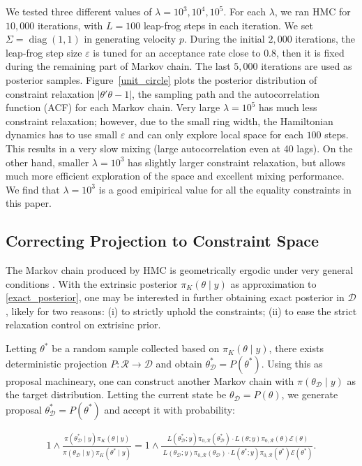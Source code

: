 \documentclass[10pt]{article}
\newcommand{\mc}[1]{\mathcal{#1}}
\DeclareMathOperator{\diag}{diag}
\begin{document}
We tested three different values of $\lambda = 10^3,10^4,10^5$. For each $\lambda$, we ran HMC for $10,000$ iterations, with $L=100$ leap-frog steps in each iteration. 
We set $\Sigma= \diag(1,1)$ in generating velocity $p$. During the initial $2,000$ iterations, the leap-frog step size $\varepsilon$ is tuned for an acceptance rate close to $0.8$, then it is fixed during the remaining part of Markov chain. The last $5,000$ iterations are used as posterior samples. Figure~\ref{unit_circle} plots the posterior distribution of constraint relaxation $|\theta'\theta -1|$, the sampling path and the autocorrelation function (ACF) for each Markov chain. Very large $\lambda=10^5$ has much less constraint relaxation; however, due to the small ring width, the Hamiltonian dynamics has to use small $\varepsilon$ and can only explore local space for each $100$ steps. This results in a very slow mixing (large autocorrelation even at 40 lags). On the other hand, smaller $\lambda=10^3$ has slightly larger constraint relaxation, but allows much more efficient exploration of the space and excellent mixing performance. We find that $\lambda=10^3$ is a good emipirical value for all the equality constraints in this paper.


\subsection{Correcting Projection to Constraint Space}
 
The Markov chain produced by HMC is geometrically ergodic under very general conditions \citep{livingstone2016geometric}. With the extrinsic posterior $\pi_K(\theta \mid y)$ as approximation to \eqref{exact_posterior}, one may be interested in further obtaining exact posterior in $\mc D$, likely for two reasons:  (i) to strictly uphold the constraints; (ii) to ease the strict relaxation control on extrisinc prior.

Letting $\theta^*$ be a random sample collected based on $\pi_K(\theta \mid y)$, there exists deterministic projection $P: \mc R\rightarrow \mc D$ and obtain $\theta^*_{\mc D}= P(\theta^*)$. Using this as proposal machineary, one can construct another Markov chain with $\pi(\theta_{\mc D}  \mid y)$ as the target distribution. Letting the current state be $\theta_{\mc D} = P(\theta)$, we generate proposal $\theta^*_{\mc D}= P(\theta^*)$ and accept it with probability:

\begin{equation}
 \begin{aligned}
 1 \wedge \frac{\pi(\theta^*_{\mc D} \mid y) \pi_K(\theta  \mid y) }{\pi(\theta_{\mc D}  \mid y)\pi_K(\theta^* \mid y)} =  1 \wedge \frac{\ L(\theta^*_{\mc D};y)\pi_{0,\mc R}(\theta^*_{\mc D})  \cdot    L(\theta;y)\pi_{0,\mc R}(\theta)   \mc E(\theta)}{\ L(\theta_{\mc D};y)\pi_{0,\mc R}(\theta_{\mc D})   \cdot L(\theta^*;y)\pi_{0,\mc R}(\theta^*)   \mc E(\theta^{*})}.
 \end{aligned}
 \end{equation}
 
\end{document}
